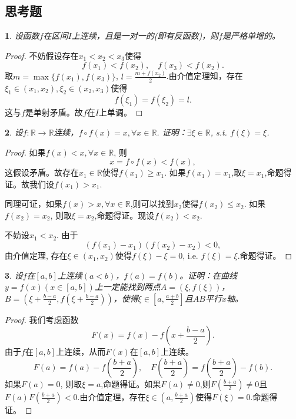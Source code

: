 \documentclass[utf8]{book}
\newtheorem{example}{}[section]             %
\begin{document}
\subsection{思考题}
\begin{example}
设函数$f$在区间$I$上连续，且是一对一的(即有反函数)，则$f$是严格单增的。
\end{example}
\begin{proof}
不妨假设存在$x_1 < x_2 < x_3$使得
$$f(x_1) < f(x_2), \quad f(x_3) < f(x_2).$$
取$m=\max\{f(x_1), f(x_3)\}$, $l=\displaystyle\frac{m+f(x_2)}{2}$.由介值定理知，存在
$\xi_1\in(x_1, x_2), \xi_2\in(x_2, x_3)$使得
$$f(\xi_1) = f(\xi_2)=l.$$
这与$f$是单射矛盾。故$f$在$I$上单调。
\end{proof}
\begin{example}
设$f:\mathbb{R}\rightarrow\mathbb{R}$连续，$f\circ f(x)=x, \forall x\in\mathbb{R}$. 证明：$\exists \xi\in\mathbb{R}$, s.t. $f(\xi)=\xi$.
\end{example}
\begin{proof}
如果$f(x) < x,\forall x\in\mathbb{R}$, 则
$$x = f\circ f(x) < f(x),$$
这假设矛盾。故存在$x_1\in\mathbb{R}$使得$f(x_1) \geq x_1$.
如果$f(x_1) = x_1$,取$\xi=x_1$,命题得证。故我们设$f(x_1) > x_1$.

同理可证，如果$f(x) > x,\forall x\in\mathbb{R}$,则可以找到$x_2$使得$f(x_2) \leq x_2$.
如果$f(x_2) = x_2$, 则取$\xi=x_2$,命题得证。现设$f(x_2) < x_2$.

不妨设$x_1 < x_2$. 由于$$(f(x_1) - x_1)(f(x_2)-x_2) < 0,$$
由介值定理, 存在$\xi\in(x_1, x_2)$使得$f(\xi) -\xi = 0$, i.e. $f(\xi) = \xi$.命题得证。
\end{proof}
\begin{example}
设$f$在$[a,b]$上连续$(a<b)$，$f(a)=f(b)$。证明：在曲线$y=f(x)(x\in[a,b])$上一定能找到两点$A=(\xi,f(\xi))$，$B=(\xi+\displaystyle\frac{b-a}{2}, f(\xi+\displaystyle\frac{b-a}{2}))$，使得$\xi\in[a, \displaystyle\frac{a+b}{2}]$且$AB$平行$x$轴。
\end{example}
\begin{proof}我们考虑函数
$$F(x) = f(x) - f\left(x+\displaystyle\frac{b-a}{2}\right).$$
由于$f$在$[a,b]$上连续，从而$F(x)$在$[a,b]$上连续。
$$F(a) = f(a) - f\left(\frac{b+a}{2}\right), \quad F\left(\frac{b+a}{2}\right) = f\left(\frac{b+a}{2}\right) - f(b).$$
如果$F(a) = 0$, 则取$\xi=a$,命题得证。如果$F(a) \neq 0$,则$F\left(\frac{b+a}{2}\right)\neq 0$且$F(a)F\left(\frac{b+a}{2}\right) < 0$.由介值定理，存在$\xi\in\left(a,\displaystyle\frac{b+a}{2}\right)$使得$F(\xi) = 0$.命题得证。
\end{proof}
\end{document}
